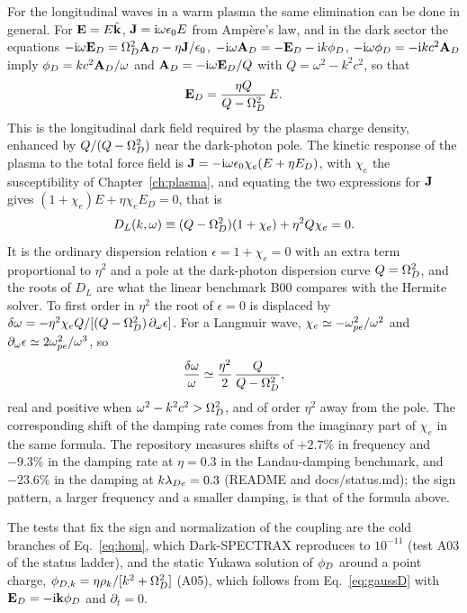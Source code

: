 For the longitudinal waves in a warm plasma the same elimination can be done in general. For $\mathbf E=E\hat{\mathbf k}$, $\mathbf J=\mathrm{i}\omega\epsilon_0E$ from Amp\`ere's law, and in the dark sector the equations $-\mathrm{i}\omega\mathbf E_D=\Omega_D^2\mathbf A_D-\eta\mathbf J/\epsilon_0$, $-\mathrm{i}\omega\mathbf A_D=-\mathbf E_D-\mathrm{i} k\phi_D$, $-\mathrm{i}\omega\phi_D=-\mathrm{i} kc^2\mathbf A_D$ imply $\phi_D=kc^2\mathbf A_D/\omega$ and $\mathbf A_D=-\mathrm{i}\omega\mathbf E_D/Q$ with $Q=\omega^2-k^2c^2$, so that
\begin{equation}
\mathbf E_D=\frac{\eta Q}{Q-\Omega_D^2}\,E .
\end{equation}
This is the longitudinal dark field required by the plasma charge density, enhanced by $Q/(Q-\Omega_D^2)$ near the dark-photon pole. The kinetic response of the plasma to the total force field is $\mathbf J=-\mathrm{i}\omega\epsilon_0\chi_e(E+\eta E_D)$, with $\chi_e$ the susceptibility of Chapter~\ref{ch:plasma}, and equating the two expressions for $\mathbf J$ gives $(1+\chi_e)E+\eta\chi_eE_D=0$, that is
\begin{equation}
D_L(k,\omega)\equiv(Q-\Omega_D^2)(1+\chi_e)+\eta^2Q\chi_e=0 .\label{eq:DL}
\end{equation}
It is the ordinary dispersion relation $\epsilon=1+\chi_e=0$ with an extra term proportional to $\eta^2$ and a pole at the dark-photon dispersion curve $Q=\Omega_D^2$, and the roots of $D_L$ are what the linear benchmark B00 compares with the Hermite solver. To first order in $\eta^2$ the root of $\epsilon=0$ is displaced by $\delta\omega=-\eta^2\chi_eQ/[(Q-\Omega_D^2)\,\partial_\omega\epsilon]$. For a Langmuir wave, $\chi_e\simeq-\omega_{pe}^2/\omega^2$ and $\partial_\omega\epsilon\simeq2\omega_{pe}^2/\omega^3$, so
\begin{equation}
\frac{\delta\omega}{\omega}\simeq\frac{\eta^2}{2}\,\frac{Q}{Q-\Omega_D^2} ,
\end{equation}
real and positive when $\omega^2-k^2c^2>\Omega_D^2$, and of order $\eta^2$ away from the pole. The corresponding shift of the damping rate comes from the imaginary part of $\chi_e$ in the same formula. The repository measures shifts of $+2.7\%$ in frequency and $-9.3\%$ in the damping rate at $\eta=0.3$ in the Landau-damping benchmark, and $-23.6\%$ in the damping at $k\lambda_{De}=0.3$ (README and docs/status.md); the sign pattern, a larger frequency and a smaller damping, is that of the formula above.

The tests that fix the sign and normalization of the coupling are the cold branches of Eq.~\eqref{eq:hom}, which Dark-SPECTRAX reproduces to $10^{-11}$ (test A03 of the status ladder), and the static Yukawa solution of $\phi_D$ around a point charge, $\phi_{D,k}=\eta\rho_k/[k^2+\Omega_D^2]$ (A05), which follows from Eq.~\eqref{eq:gaussD} with $\mathbf E_D=-\mathrm{i}\mathbf k\phi_D$ and $\partial_t=0$.

